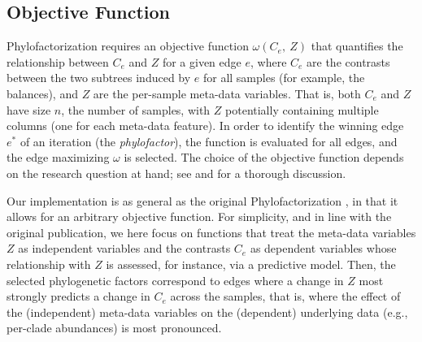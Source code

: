 
\subsection{Objective Function}
\label{sec:Factorization:sub:Methods:sub:ObjectiveFunction}


Phylofactorization requires an objective function $\omega(C_e, ~Z)$
that quantifies the relationship between $C_e$ and $Z$ for a given edge $e$,
where $C_e$ are the contrasts between the two subtrees induced by $e$ for all samples (for example, the balances),
and $Z$ are the per-sample meta-data variables.
That is, both $C_e$ and $Z$ have size $n$, the number of samples,
with $Z$ potentially containing multiple columns (one for each meta-data feature).
In order to identify the winning edge $e^*$ of an iteration (the \emph{phylofactor}),
the function is evaluated for all edges, and the edge maximizing $\omega$ is selected.
The choice of the objective function depends on the research question at hand;
see \cite{Washburne2017a} and \cite{Washburne2018} for a thorough discussion.

Our implementation is as general as the original Phylofactorization \cite{Washburne2017a},
in that it allows for an arbitrary objective function.
For simplicity, and in line with the original publication,
we here focus on functions that treat the meta-data variables $Z$ as independent variables
and the contrasts $C_e$ as dependent variables whose relationship with $Z$ is assessed, for instance, via a predictive model.
Then, the selected phylogenetic factors correspond to edges
where a change in $Z$ most strongly predicts a change in $C_e$ across the samples,
that is, where the effect of the (independent) meta-data variables
on the (dependent) underlying data (e.g., per-clade abundances) is most pronounced.

